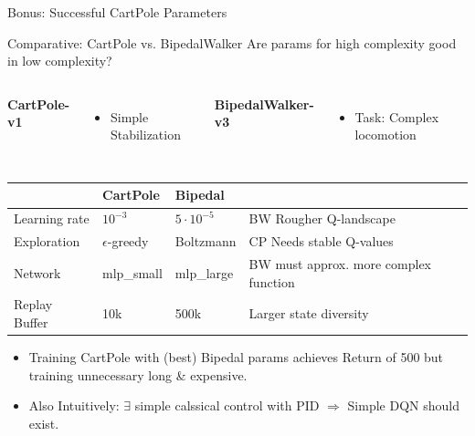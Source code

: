 \documentclass[aspectratio=169]{beamer}
\begin{document}
\begin{frame}{Bonus: Successful CartPole Parameters}
\end{frame}

\begin{frame}{Comparative: CartPole vs. BipedalWalker}
  \vspace{0.5em}
  Are params for high complexity good in low complexity?
  \vspace{1.0em}
  \begin{columns}[t]
    \textbf{CartPole-v1}
    \begin{itemize}
      \item \footnotesize Simple Stabilization
    \end{itemize}
    \textbf{BipedalWalker-v3}
    \begin{itemize}
      \item \footnotesize Task: Complex locomotion
    \end{itemize}
  \end{columns}

  \vspace{1.0em}
  \centering
  \small

  \begin{tabular}{@{}llll@{}}
    \toprule
    {} & \textbf{CartPole} & \textbf{Bipedal} & {} \\ \midrule
    Learning rate & $10^{-3}$ & $5 \cdot 10^{-5}$ & BW Rougher Q-landscape \\
    Exploration & $\epsilon$-greedy & Boltzmann & CP Needs stable Q-values \\
    Network & mlp\_small & mlp\_large & BW must approx. more complex function \\
    Replay Buffer & 10k & 500k & Larger state diversity \\ 
    \bottomrule
  \end{tabular}

  \vspace{1.0em}
  \begin{center}
    \begin{itemize}
      \item \footnotesize Training CartPole with (best) Bipedal params achieves Return of 500 but training unnecessary long \& expensive.
      \item \footnotesize Also Intuitively: $\exists$ simple calssical control with PID $\Rightarrow$ Simple DQN should exist. 
    \end{itemize}
  \end{center}
\end{frame}
\end{document}
